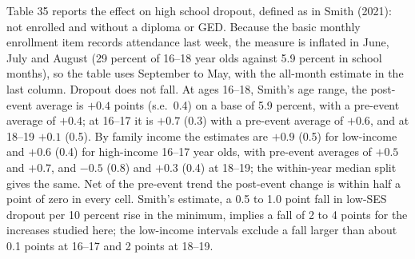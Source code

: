 \documentclass[12pt]{article}
\begin{document}
Table 35 reports the effect on high school dropout, defined as in Smith (2021): not enrolled and without a diploma or GED. Because the basic monthly enrollment item records attendance last week, the measure is inflated in June, July and August (29 percent of 16--18 year olds against 5.9 percent in school months), so the table uses September to May, with the all-month estimate in the last column. Dropout does not fall. At ages 16--18, Smith's age range, the post-event average is $+0.4$ points (s.e.\ 0.4) on a base of 5.9 percent, with a pre-event average of $+0.4$; at 16--17 it is $+0.7$ (0.3) with a pre-event average of $+0.6$, and at 18--19 $+0.1$ (0.5). By family income the estimates are $+0.9$ (0.5) for low-income and $+0.6$ (0.4) for high-income 16--17 year olds, with pre-event averages of $+0.5$ and $+0.7$, and $-0.5$ (0.8) and $+0.3$ (0.4) at 18--19; the within-year median split gives the same. Net of the pre-event trend the post-event change is within half a point of zero in every cell. Smith's estimate, a 0.5 to 1.0 point fall in low-SES dropout per 10 percent rise in the minimum, implies a fall of 2 to 4 points for the increases studied here; the low-income intervals exclude a fall larger than about 0.1 points at 16--17 and 2 points at 18--19.
\end{document}
